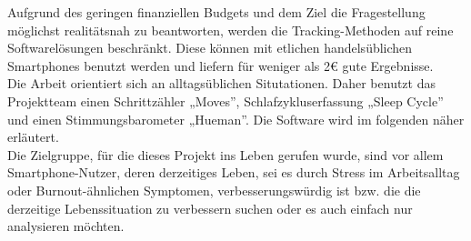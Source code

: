 Aufgrund des geringen finanziellen Budgets und dem Ziel die Fragestellung möglichst realitätsnah zu beantworten, werden die Tracking-Methoden auf reine Softwarelösungen beschränkt. 
Diese können mit etlichen handelsüblichen Smartphones benutzt werden und liefern für weniger als 2\euro{} gute Ergebnisse\cite{web:TrackingResults,web:AppPreis}. \\
Die Arbeit orientiert sich an alltagsüblichen Situtationen. 
Daher benutzt das Projektteam einen Schrittzähler „Moves”, Schlafzykluserfassung „Sleep Cycle” und einen Stimmungsbarometer „Hueman”.
Die Software wird im folgenden näher erläutert. \\
Die Zielgruppe, für die dieses Projekt ins Leben gerufen wurde, sind vor allem Smartphone-Nutzer, deren derzeitiges Leben, sei es durch Stress im Arbeitsalltag oder Burnout-ähnlichen Symptomen, verbesserungswürdig ist bzw. die die derzeitige Lebenssituation zu verbessern suchen oder es auch einfach nur analysieren möchten.  


